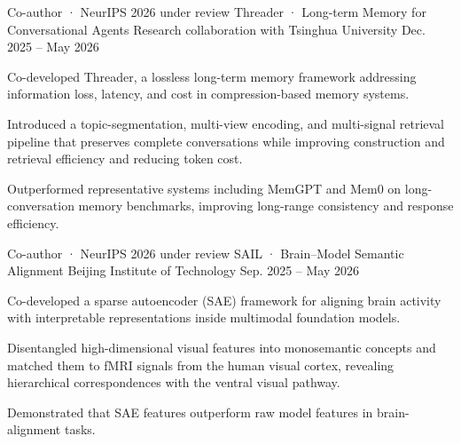 
\begin{cventries}

  \cventry
    {Co-author · NeurIPS 2026 under review}
    {Threader · Long-term Memory for Conversational Agents}
    {Research collaboration with Tsinghua University}
    {Dec. 2025 -- May 2026}
    {
      \begin{cvitems}
        \item {Co-developed Threader, a lossless long-term memory framework addressing information loss, latency, and cost in compression-based memory systems.}
        \item {Introduced a topic-segmentation, multi-view encoding, and multi-signal retrieval pipeline that preserves complete conversations while improving construction and retrieval efficiency and reducing token cost.}
        \item {Outperformed representative systems including MemGPT and Mem0 on long-conversation memory benchmarks, improving long-range consistency and response efficiency.}
      \end{cvitems}
    }
\vspace{0.8cm} %
  \cventry
    {Co-author · NeurIPS 2026 under review}
    {SAIL · Brain--Model Semantic Alignment}
    {Beijing Institute of Technology}
    {Sep. 2025 -- May 2026}
    {
      \begin{cvitems}
        \item {Co-developed a sparse autoencoder (SAE) framework for aligning brain activity with interpretable representations inside multimodal foundation models.}
        \item {Disentangled high-dimensional visual features into monosemantic concepts and matched them to fMRI signals from the human visual cortex, revealing hierarchical correspondences with the ventral visual pathway.}
        \item {Demonstrated that SAE features outperform raw model features in brain-alignment tasks.}
      \end{cvitems}
    }

\end{cventries}
